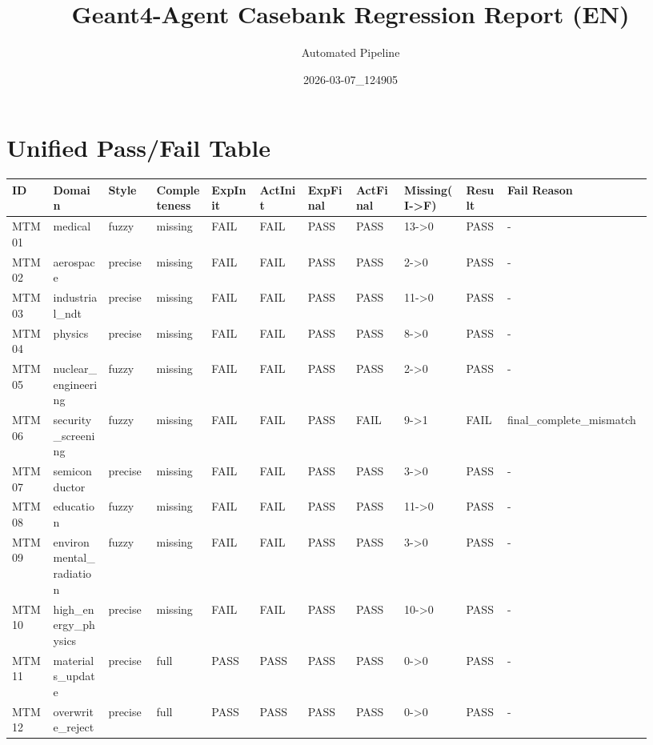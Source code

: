 \documentclass[11pt]{ctexart}
\title{Geant4-Agent Casebank Regression Report (EN)}
\author{Automated Pipeline}
\date{2026-03-07\_124905}
\begin{document}
\maketitle
\section{Unified Pass/Fail Table}
\begin{longtable}{p{0.06\linewidth}p{0.08\linewidth}p{0.07\linewidth}p{0.08\linewidth}p{0.07\linewidth}p{0.07\linewidth}p{0.07\linewidth}p{0.07\linewidth}p{0.09\linewidth}p{0.06\linewidth}p{0.21\linewidth}}
\toprule
ID & Domain & Style & Completeness & ExpInit & ActInit & ExpFinal & ActFinal & Missing(I->F) & Result & Fail Reason \\
\midrule
MTM01 & medical & fuzzy & missing & FAIL & FAIL & PASS & PASS & 13->0 & PASS & - \\
MTM02 & aerospace & precise & missing & FAIL & FAIL & PASS & PASS & 2->0 & PASS & - \\
MTM03 & industrial\_ndt & precise & missing & FAIL & FAIL & PASS & PASS & 11->0 & PASS & - \\
MTM04 & physics & precise & missing & FAIL & FAIL & PASS & PASS & 8->0 & PASS & - \\
MTM05 & nuclear\_engineering & fuzzy & missing & FAIL & FAIL & PASS & PASS & 2->0 & PASS & - \\
MTM06 & security\_screening & fuzzy & missing & FAIL & FAIL & PASS & FAIL & 9->1 & FAIL & final\_complete\_mismatch \\
MTM07 & semiconductor & precise & missing & FAIL & FAIL & PASS & PASS & 3->0 & PASS & - \\
MTM08 & education & fuzzy & missing & FAIL & FAIL & PASS & PASS & 11->0 & PASS & - \\
MTM09 & environmental\_radiation & fuzzy & missing & FAIL & FAIL & PASS & PASS & 3->0 & PASS & - \\
MTM10 & high\_energy\_physics & precise & missing & FAIL & FAIL & PASS & PASS & 10->0 & PASS & - \\
MTM11 & materials\_update & precise & full & PASS & PASS & PASS & PASS & 0->0 & PASS & - \\
MTM12 & overwrite\_reject & precise & full & PASS & PASS & PASS & PASS & 0->0 & PASS & - \\
\bottomrule
\end{longtable}
\end{document}

